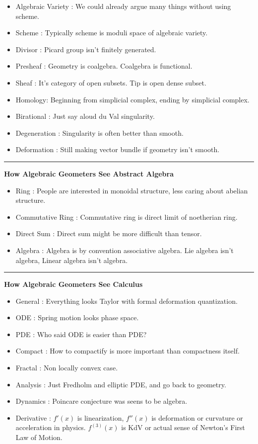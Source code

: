 \documentclass{article}
\begin{document}
\begin{itemize}
\item Algebraic Variety : We could already argue many things without using scheme.
\item Scheme : Typically scheme is moduli space of algebraic variety.
\item Divisor : Picard group isn't finitely generated.
\item Presheaf : Geometry is coalgebra. Coalgebra is functional.
\item Sheaf : It's category of open subsets. Tip is open dense subset.
\item Homology: Beginning from simplicial complex, ending by simplicial complex.
\item Birational : Just say aloud du Val singularity.
\item Degeneration : Singularity is often better than smooth.
\item Deformation : Still making vector bundle if geometry isn't smooth.
\end{itemize}


\noindent\rule{\textwidth}{0.4pt}

\noindent
\textbf{How Algebraic Geometers See Abstract Algebra}

\begin{itemize}
\item Ring : People are interested in monoidal structure, less caring about abelian structure.
\item Commutative Ring : Commutative ring is direct limit of noetherian ring.
\item Direct Sum : Direct sum might be more difficult than tensor.
\item Algebra : Algebra is by convention associative algebra. Lie algebra isn't algebra, Linear algebra isn't algebra.
\end{itemize}



\noindent\rule{\textwidth}{0.4pt}

\noindent
\textbf{How Algebraic Geometers See Calculus}

\begin{itemize}
\item General : Everything looks Taylor with formal deformation quantization.
\item ODE : Spring motion looks phase space.
\item PDE : Who said ODE is easier than PDE?
\item Compact : How to compactify is more important than compactness itself.
\item Fractal : Non locally convex case.
\item Analysis : Just Fredholm and elliptic PDE, and go back to geometry.
\item Dynamics : Poincare conjecture was seens to be algebra.
\item Derivative : $f'(x)$ is linearization, $f''(x)$ is deformation or curvature or acceleration in physics.
$f^{(3)}(x)$ is KdV or actual sense of Newton's First Law of Motion.
\end{itemize}
\end{document}
